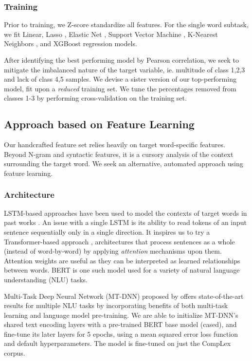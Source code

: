 \documentclass[11pt,a4paper]{article}
\begin{document}
\subsubsection{Training}

Prior to training, we Z-score standardize all features. For the single word subtask, we fit Linear, Lasso \citep{tibshirani1996regression}, Elastic Net \citep{zou2005regularization}, Support Vector Machine \citep{platt1999probabilistic}, K-Nearest Neighbors \citep{wiki:K-nearest_neighbors_algorithm}, and XGBoost \citep{chen2016xgboost} regression models. 

After identifying the best performing model by Pearson correlation, we seek to mitigate the imbalanced nature of the target variable, ie. multitude of class 1,2,3 and lack of class 4,5 samples. We devise a sister version of our top-performing model, fit upon a \textit{reduced} training set. We tune the percentages removed from classes 1-3 by performing cross-validation on the training set.

\subsection{Approach based on Feature Learning}

Our handcrafted feature set relies heavily on target word-specific features. Beyond N-gram and syntactic features, it is a cursory analysis of the context surrounding the target word. We seek an alternative, automated approach using feature learning.

\subsubsection{Architecture}

LSTM-based approaches have been used to model the contexts of target words in past works \citep{hartmann2018nilc, de2018deep}. An issue with a single LSTM is its ability to read tokens of an input sentence sequentially only in a single direction. It inspires us to try a Transformer-based approach \citep{vaswani2017attention}, architectures that process sentences as a whole (instead of word-by-word) by applying \textit{attention} mechanisms upon them. Attention weights are useful as they can be interpreted as learned relationships between words. BERT \citep{devlin2018bert} is one such model used for a variety of natural language understanding (NLU) tasks.

Multi-Task Deep Neural Network (MT-DNN) proposed by \citet{liu2019multi} offers state-of-the-art results for multiple NLU tasks by incorporating benefits of both multi-task learning and language model pre-training. We are able to initialize MT-DNN's shared text encoding layers with a pre-trained BERT base model (cased), and fine-tune its later layers for 5 epochs, using a mean squared error loss function and default hyperparameters. The model is fine-tuned on just the CompLex corpus.
\end{document}
